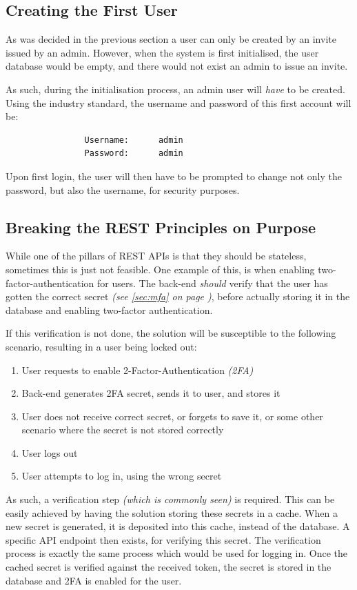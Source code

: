 		\subsection{Creating the First User}
			As was decided in the previous section a user can only be created by an invite issued by an admin. However, when the system is first initialised, the user database would be empty, and there would not exist an admin to issue an invite.

			As such, during the initialisation process, an admin user will \emph{have} to be created. Using the industry standard, the username and password of this first account will be:
			\begin{verbatim}
				Username:      admin
				Password:      admin
			\end{verbatim}
			Upon first login, the user will then have to be prompted to change not only the password, but also the username, for security purposes.

		\subsection{Breaking the REST Principles on Purpose}
			\label{sec:design:breaking-rest}
			While one of the pillars of REST APIs is that they should be stateless, sometimes this is just not feasible. One example of this, is when enabling two-factor-authentication for users. The back-end \emph{should} verify that the user has gotten the correct secret \emph{(see \ref{sec:mfa} on page \pageref{sec:mfa})}, before actually storing it in the database and enabling two-factor authentication. 

			If this verification is not done, the solution will be susceptible to the following scenario, resulting in a user being locked out:
			\begin{enumerate}
				\item User requests to enable 2-Factor-Authentication \emph{(2FA)}
				\item Back-end generates 2FA secret, sends it to user, and stores it
				\item User does not receive correct secret, or forgets to save it, or some other scenario where the secret is not stored correctly
				\item User logs out
				\item User attempts to log in, using the wrong secret
			\end{enumerate}

			As such, a verification step \emph{(which is commonly seen)} is required. This can be easily achieved by having the solution storing these secrets in a cache. When a new secret is generated, it is deposited into this cache, instead of the database. A specific API endpoint then exists, for verifying this secret. The verification process is exactly the same process which would be used for logging in. Once the cached secret is verified against the received token, the secret is stored in the database and 2FA is enabled for the user.

